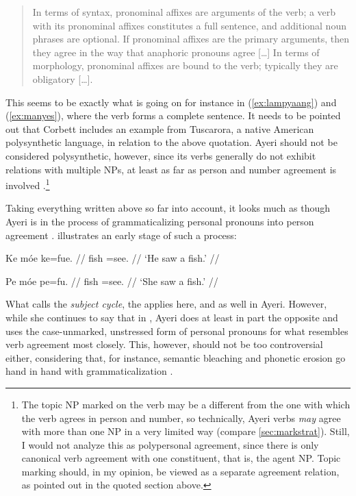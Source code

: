 \blockcquote[99--100]{corbett2006}{In terms of syntax, pronominal affixes are 
arguments of the verb; a verb with its pronominal affixes constitutes a full 
sentence, and additional noun phrases are optional. If pronominal affixes are 
the primary arguments, then they agree in the way that anaphoric pronouns agree 
[…] In terms of morphology, pronominal affixes are bound to the verb; typically 
they are obligatory […].}

\noindent This seems to be exactly what is going on for instance in 
(\ref{ex:lampyaang}) and (\ref{ex:manyes}), where the verb forms a complete 
sentence. It needs to be pointed out that Corbett includes an example from 
Tuscarora, a native American polysynthetic language, in relation to the above 
quotation. Ayeri should not be considered polysynthetic, however, since its 
verbs generally do not exhibit relations with multiple NPs, at least as far as 
person and number agreement is involved 
\citep[45--46]{comrie1989}.\footnote{The topic NP marked on the verb may be a 
different from the one with which the verb agrees in person and number, so 
technically, Ayeri verbs \emph{may} agree with more than one NP in a very 
limited way (compare \autoref{sec:markstrat}). Still, I would not analyze this 
as polypersonal agreement, since there is only canonical verb agreement with 
one constituent, that is, the agent NP. Topic marking should, in my opinion, be 
viewed as a separate agreement relation, as pointed out in the quoted section 
above.}

Taking everything written above so far into account, it looks much as though 
Ayeri is in the process of grammaticalizing personal pronouns into person 
agreement \parencites[42--45]{lehmann2015}[493--497]{vangelderen2011}. 
\citet[76--77]{corbett2006} illustrates an early stage of such a process:

\pex %
\a\begingl{}%
	\gla Ke móe ke=fue.  //
	\glb \TsgM{} fish \TsgM{}=​see.\TsgM{} {} //
	\glft `He saw a fish.' //
\endgl

\a\begingl
	\gla Pe móe pe=fu.  //
	\glb \TsgF{} fish \TsgF{}=​see.\TsgF{} {} //
	\glft `She saw a fish.' //
\endgl

\xe

What \citeauthor{vangelderen2011} calls the \emph{subject cycle}, the 
 applies here, and as well in 
Ayeri. However, while she continues to say that in 
, Ayeri does at least in part the 
opposite and uses the case-unmarked, unstressed form of personal pronouns for 
what resembles verb agreement most closely. This, however, should not be too 
controversial either, considering that, for instance, semantic bleaching and 
phonetic erosion go hand in hand with grammaticalization 
\parencites[136--137]{lehmann2015}[497]{vangelderen2011}.

